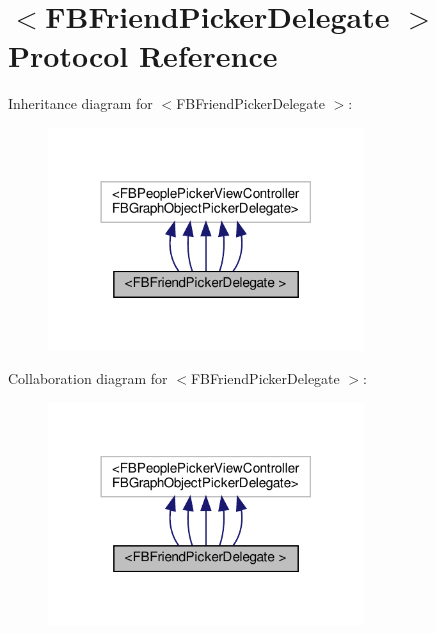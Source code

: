 \hypertarget{protocolFBFriendPickerDelegate_01-p}{}\section{$<$F\+B\+Friend\+Picker\+Delegate $>$ Protocol Reference}
\label{protocolFBFriendPickerDelegate_01-p}


Inheritance diagram for $<$F\+B\+Friend\+Picker\+Delegate $>$\+:
\nopagebreak
\begin{figure}[H]
\begin{center}
\leavevmode
\includegraphics[width=237pt]{protocolFBFriendPickerDelegate_01-p__inherit__graph}
\end{center}
\end{figure}


Collaboration diagram for $<$F\+B\+Friend\+Picker\+Delegate $>$\+:
\nopagebreak
\begin{figure}[H]
\begin{center}
\leavevmode
\includegraphics[width=237pt]{protocolFBFriendPickerDelegate_01-p__coll__graph}
\end{center}
\end{figure}
